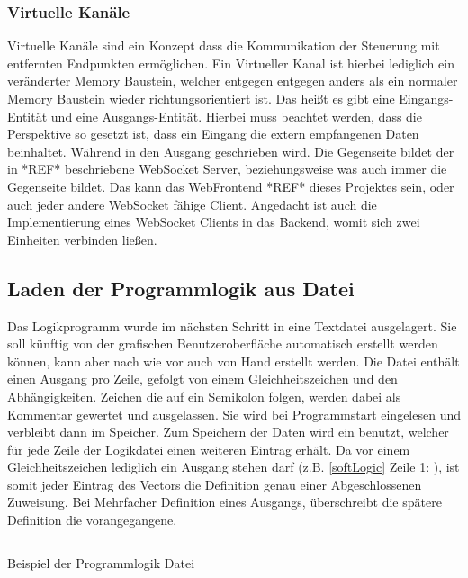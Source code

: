 \subsubsection{Virtuelle Kanäle}\label{kap:ums:virtualchannel}
Virtuelle Kanäle sind ein Konzept dass die Kommunikation der Steuerung mit entfernten Endpunkten ermöglichen. Ein Virtueller Kanal ist hierbei lediglich ein veränderter Memory Baustein, welcher entgegen entgegen anders als ein normaler Memory Baustein wieder richtungsorientiert ist. Das heißt es gibt eine Eingangs-Entität und eine Ausgangs-Entität. Hierbei muss beachtet werden, dass die Perspektive so gesetzt ist, dass ein Eingang die extern empfangenen Daten beinhaltet. Während in den Ausgang geschrieben wird. Die Gegenseite bildet der in *REF* beschriebene WebSocket Server, beziehungsweise was auch immer die Gegenseite bildet. Das kann das WebFrontend *REF* dieses Projektes sein, oder auch jeder andere WebSocket fähige Client. Angedacht ist auch die Implementierung eines WebSocket Clients in das Backend, womit sich zwei Einheiten verbinden ließen. 


\subsection{Laden der Programmlogik aus Datei}\label{kap:ums:logicOutsource}
Das Logikprogramm wurde im nächsten Schritt in eine Textdatei ausgelagert. Sie soll künftig von der grafischen Benutzeroberfläche automatisch erstellt werden können, kann aber nach wie vor auch von Hand erstellt werden. Die Datei enthält einen Ausgang pro Zeile, gefolgt von einem Gleichheitszeichen und den Abhängigkeiten. Zeichen die auf ein Semikolon folgen, werden dabei als Kommentar gewertet und ausgelassen. Sie wird bei Programmstart eingelesen und verbleibt dann im Speicher. Zum Speichern der Daten wird ein  benutzt, welcher für jede Zeile der Logikdatei einen weiteren Eintrag erhält. Da vor einem Gleichheitszeichen lediglich ein Ausgang stehen darf (z.B. \ref{softLogic} Zeile 1: ), ist somit jeder Eintrag des Vectors die Definition genau einer Abgeschlossenen Zuweisung. Bei Mehrfacher Definition eines Ausgangs, überschreibt die spätere Definition die vorangegangene. 

\begin{listing}[H]
	\inputminted[numbersep=1pt,fontsize=\scriptsize,frame=single, firstline=29,lastline=36]{c}{./code/logic.conf}
	\caption{Beispiel der Programmlogik Datei}
	\label{code:softLogic}
\end{listing}


